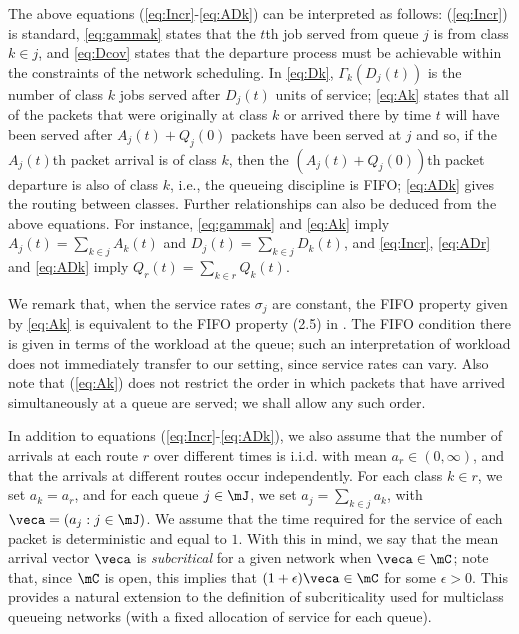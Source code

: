 \documentclass{amsart}
\begin{document}
The above equations (\ref{eq:Incr}-\ref{eq:ADk}) can be interpreted as follows: (\ref{eq:Incr}) is standard, \eqref{eq:gammak} states that the $t$th job served from queue $j$ is from class $k\in j$, and \eqref{eq:Dcov} states that the departure process must be achievable within the constraints of the network scheduling. 
In \eqref{eq:Dk}, $\Gamma_k(D_j(t))$ is the number of class $k$ jobs served after $D_j(t)$ units of service;
\eqref{eq:Ak} states that all of the packets that were originally at class $k$ or arrived there by time $t$ will have been served after $A_j(t) + Q_j(0)$ packets have been served at  $j$ and so, if the $A_j(t)$th packet arrival is of class $k$, then the $(A_j(t) + Q_j(0))$th packet departure is also of class $k$, i.e., the queueing discipline is FIFO; \eqref{eq:ADk} gives the routing between classes.
Further relationships can also be deduced from the above equations. For instance, \eqref{eq:gammak} and \eqref{eq:Ak} imply
$A_j(t) = \sum_{k \in j} A_k(t)$ and 
 $ D_j(t) = \sum_{k \in j} D_k(t)$, 
and \eqref{eq:Incr}, \eqref{eq:ADr} and \eqref{eq:ADk} imply
$Q_r(t) = \sum_{k\in r} Q_k(t)$.

We remark that, when the service rates $\sigma_j$ are constant, the FIFO property given by \eqref{eq:Ak} is equivalent to the FIFO property (2.5) in \cite{Br96a}. The FIFO condition there is given in terms of the workload at the queue; such an interpretation of workload does not immediately transfer to our setting, since service rates can vary.   Also note that (\ref{eq:Ak})
does not restrict the order in which packets that have arrived simultaneously at a queue are served; we shall allow any such order.

In addition to equations (\ref{eq:Incr}-\ref{eq:ADk}), we also assume that the number of arrivals at each route $r$ over different times is i.i.d. with mean $a_r\in (0,\infty)$, and that the arrivals at different routes occur independently.  
For each class $k\in r$, we set $a_k = a_{r}$, and  for each queue $j\in\mJ$, we set $a_j = \sum_{k \in j} a_k$, with $\veca=(a_j : j\in\mJ)$.
We assume that the time required for the service of each packet is
deterministic and equal to $1$.  With this in mind, we say that the mean arrival vector $\veca$ is 
\emph{subcritical} for a given network when $\veca \in \mC$;
note that, since $\mC$ is open, this implies that $(1+\epsilon)\veca \in \mC$
for some $\epsilon > 0$. This provides a natural extension to the definition of subcriticality used for multiclass queueing networks (with a fixed allocation of service for each queue).
\end{document}
